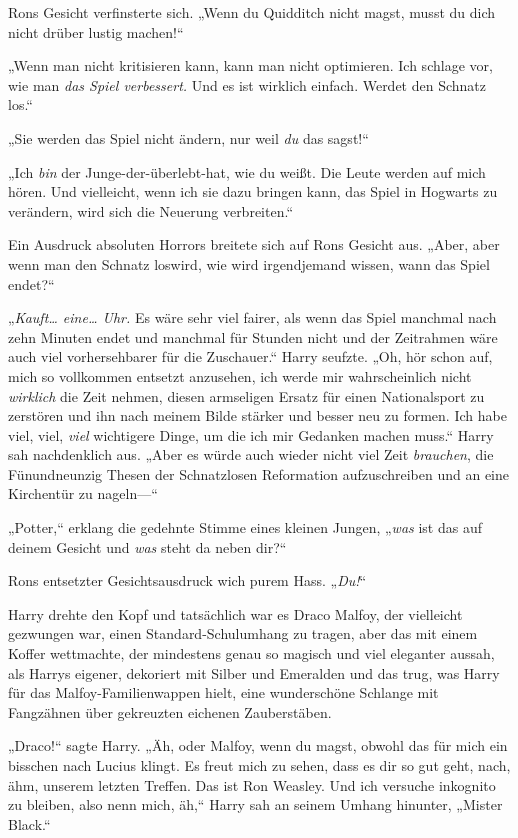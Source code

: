{Rons Gesicht verfinsterte sich. „Wenn du Quidditch nicht magst, musst du dich nicht drüber lustig machen!“

„Wenn man nicht kritisieren kann, kann man nicht optimieren. Ich schlage vor, wie man \emph{das Spiel verbessert.} Und es ist wirklich einfach. Werdet den Schnatz los.“

„Sie werden das Spiel nicht ändern, nur weil \emph{du} das sagst!“

„Ich \emph{bin} der Junge-der-überlebt-hat, wie du weißt. Die Leute werden auf mich hören. Und vielleicht, wenn ich sie dazu bringen kann, das Spiel in Hogwarts zu verändern, wird sich die Neuerung verbreiten.“

Ein Ausdruck absoluten Horrors breitete sich auf Rons Gesicht aus. „Aber, aber wenn man den Schnatz loswird, wie wird irgendjemand wissen, wann das Spiel endet?“

„\emph{Kauft… eine… Uhr.} Es wäre sehr viel fairer, als wenn das Spiel manchmal nach zehn Minuten endet und manchmal für Stunden nicht und der Zeitrahmen wäre auch viel vorhersehbarer für die Zuschauer.“ Harry seufzte. „Oh, hör schon auf, mich so vollkommen entsetzt anzusehen, ich werde mir wahrscheinlich nicht \emph{wirklich} die Zeit nehmen, diesen armseligen Ersatz für einen Nationalsport zu zerstören und ihn nach meinem Bilde stärker und besser neu zu formen. Ich habe viel, viel, \emph{viel} wichtigere Dinge, um die ich mir Gedanken machen muss.“ Harry sah nachdenklich aus. „Aber es würde auch wieder nicht viel Zeit \emph{brauchen}, die Fünundneunzig Thesen der Schnatzlosen Reformation aufzuschreiben und an eine Kirchentür zu nageln—“

„Potter,“ erklang die gedehnte Stimme eines kleinen Jungen, „\emph{was} ist das auf deinem Gesicht und \emph{was} steht da neben dir?“

Rons entsetzter Gesichtsausdruck wich purem Hass. „\emph{Du!}“

Harry drehte den Kopf und tatsächlich war es Draco Malfoy, der vielleicht gezwungen war, einen Standard-Schulumhang zu tragen, aber das mit einem Koffer wettmachte, der mindestens genau so magisch und viel eleganter aussah, als Harrys eigener, dekoriert mit Silber und Emeralden und das trug, was Harry für das Malfoy-Familienwappen hielt, eine wunderschöne Schlange mit Fangzähnen über gekreuzten eichenen Zauberstäben.

„Draco!“ sagte Harry. „Äh, oder Malfoy, wenn du magst, obwohl das für mich ein bisschen nach Lucius klingt. Es freut mich zu sehen, dass es dir so gut geht, nach, ähm, unserem letzten Treffen. Das ist Ron Weasley. Und ich versuche inkognito zu bleiben, also nenn mich, äh,“ Harry sah an seinem Umhang hinunter, „Mister Black.“

}
